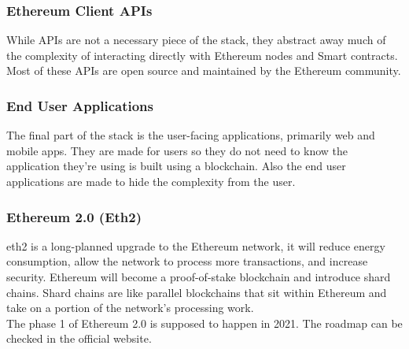 \subsubsection{Ethereum Client APIs}
While APIs are not a necessary piece of the stack, they abstract away much of the complexity of interacting directly with Ethereum nodes and Smart contracts.\\

Most of these APIs are open source and maintained by the Ethereum community.

\subsubsection{End User Applications}
The final part of the stack is the user-facing applications, primarily web and mobile apps.  They are made for users so they do not need to know the application they're using is built using a blockchain. Also the end user applications are made to hide the complexity from the user.

\subsubsection{Ethereum 2.0 (Eth2)}
\acrshort{eth2}\cite{eth2} is a long-planned upgrade to the Ethereum network, it will reduce energy consumption, allow the network to process more transactions, and increase security.  Ethereum will become a proof-of-stake blockchain and introduce shard chains. Shard chains are like parallel blockchains that sit within Ethereum and take on a portion of the network's processing work.\\

The phase 1 of Ethereum 2.0 is supposed to happen in 2021. The roadmap can be checked in the official website\cite{eth2Roadmap}.